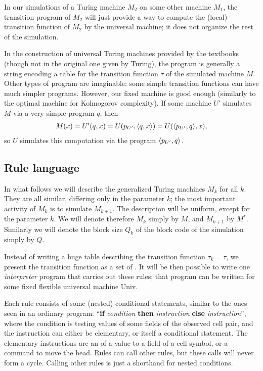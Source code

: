 \documentclass[11pt]{memoir}
\theoremstyle{definition} %
\newcommand{\Q}{Q}
\newcommand{\Un}{\mathrm{Univ}}
\begin{document}
In our simulations of a Turing machine \( M_{2} \) on some other machine \( M_{1} \),
the transition program of \( M_{2} \) will just provide a way to compute
the (local) transition function of \( M_{2} \) by the universal machine;
it does not organize the rest of the simulation.

\begin{remark}
 In the construction of universal Turing machines provided by the textbooks
(though not in the original one given by Turing), the program is generally a string
encoding a table for the transition function \( \tau \) of the simulated machine \( M \).
Other types of program are imaginable: some simple transition functions can
have much simpler programs.
However, our fixed machine is good enough (similarly to the optimal machine
for Kolmogorov complexity).
If some machine \( U' \) simulates \( M \) via a
very simple program \( q \), then
 \begin{align*}
     M(x)=U'(q,x) = U(p_{U'},{\mathopen\langle q,x\mathclose\rangle}) = U({\mathopen\langle p_{U'},q\mathclose\rangle},x),
 \end{align*}
so \( U \) simulates this computation via the program \( {\mathopen\langle p_{U'},q\mathclose\rangle} \).
\end{remark}

\subsection{Rule language}\label{sec:language}

In what follows we will describe the generalized Turing machines \( M_{k} \) for all \( k \).
They are all similar, differing only in the parameter \( k \); the most important activity
of \( M_{k} \) is to simulate \( M_{k+1} \).
The description will be uniform, except for the parameter \( k \).
We will denote therefore \( M_{k} \) simply by \( M \), and \( M_{k+1} \)  by \( M^{*} \).
Similarly we will denote the block size \( \Q_{k} \) of the block code of the 
simulation simply by \( \Q \).

Instead of writing a huge table describing the transition function \( \tau_{k}=\tau \),
we present the transition function as a set of .
It will be then possible to write one \emph{interpreter} program that carries
out these rules; that program can be written for some fixed flexible 
universal machine \( \Un \).

Each rule consists of some (nested) conditional statements,
similar to the ones seen in an ordinary program:
 ``\textbf{if} \textit{condition} \textbf{then} \textit{instruction}
\textbf{else} \textit{instruction}'', 
where the condition is testing values of some fields of the observed cell pair, and
the instruction can either be elementary, or itself a conditional statement. 
The elementary instructions are an  of a value to a field
of a cell symbol, or a command to move the head.
Rules can call other rules, but these calls will never form a cycle.
Calling other rules is just a shorthand for nested conditions.
\end{document}
